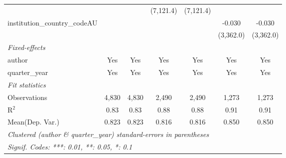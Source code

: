 \begin{tabular}{lcccccc}
                                         &                &                & (7,121.4)     & (7,121.4)     &                &   \\   
   institution\_country\_codeAU          &                &                &               &               & -0.030         & -0.030\\   
                                         &                &                &               &               & (3,362.0)      & (3,362.0)\\   
   \midrule
   \emph{Fixed-effects}\\
   author                                & Yes            & Yes            & Yes           & Yes           & Yes            & Yes\\  
   quarter\_year                         & Yes            & Yes            & Yes           & Yes           & Yes            & Yes\\  
   \midrule
   \emph{Fit statistics}\\
   Observations                          & 4,830          & 4,830          & 2,490         & 2,490         & 1,273          & 1,273\\  
   R$^2$                                 & 0.83           & 0.83           & 0.88          & 0.88          & 0.91           & 0.91\\  
Mean(Dep. Var.) & 0.823 & 0.823 & 0.816 & 0.816 & 0.850 & 0.850 \\
   \midrule \midrule
   \multicolumn{7}{l}{\emph{Clustered (author \& quarter\_year) standard-errors in parentheses}}\\
   \multicolumn{7}{l}{\emph{Signif. Codes: ***: 0.01, **: 0.05, *: 0.1}}\\
\end{tabular}
\par\endgroup
